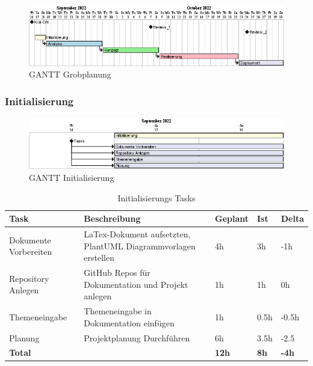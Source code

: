 \begin{figure}[H]
    \begin{center}
      \includegraphics[width=1\linewidth]{../content/diagrams/gantt/roughtPlanning/roughtPlanning.png}
      \caption{GANTT Grobplanung}
    \end{center}
  \end{figure}
  \subsubsection{Initialisierung}
  \begin{figure}[H]
    \begin{center}
      \includegraphics[width=1\linewidth]{../content/diagrams/gantt/InitializationPlanning/initializationPlanning.png}
      \caption{GANTT Initialisierung}
    \end{center}
  \end{figure}
  \begin{table}[H]
    \centering
    \settowidth{}
    \setlength\extrarowheight{2pt}
    \begin{tabulary}{1.0\textwidth}{|L|L|L|L|L|}
      \hline
      \textbf{Task} &
      \textbf{Beschreibung} &
      \textbf{Geplant}&
      \textbf{Ist}&
      \textbf{Delta}\\
      \hline
      Dokumente Vorbereiten &
      LaTex-Dokument aufsetzten, PlantUML Diagrammvorlagen erstellen &
      4h &
      3h&
      -1h\\
      \hline
      Repository Anlegen &
      GitHub Repos für Dokumentation und Projekt anlegen &
      1h &
      1h&
      0h\\
      \hline
      Themeneingabe &
      Themeneingabe in Dokumentation einfügen &
      1h &
      0.5h&
      -0.5h\\
      \hline
      Planung &
      Projektplanung Durchführen &
      6h &
      3.5h&
      -2.5\\
      \hline
      \textbf{Total} &
       &
      \textbf{12h} &
      \textbf{8h}&
      \textbf{-4h}\\
      \hline 
    \end{tabulary} 
    \caption{Initialisierungs Tasks}
  \end{table}

